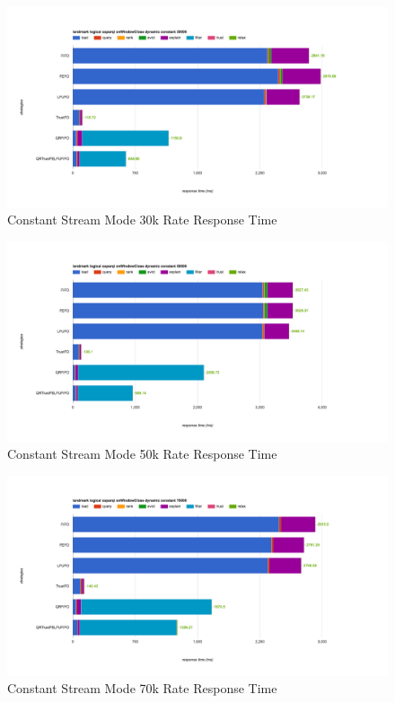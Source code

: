 \begin{figure}[!htbp]
	\centering
    \includegraphics[width=6.5in]{img/6-3wt.png}
    \caption{Constant Stream Mode 30k Rate Response Time}
    \label{fig:6-csmrrt3}
\end{figure}

\begin{figure}[!htbp]
	\centering
    \includegraphics[width=6.5in]{img/6-5wt.png}
    \caption{Constant Stream Mode 50k Rate Response Time}
    \label{fig:6-csmrrt5}
\end{figure}

\begin{figure}[!htbp]
	\centering
    \includegraphics[width=6.5in]{img/6-7wt.png}
    \caption{Constant Stream Mode 70k Rate Response Time}
    \label{fig:6-csmrrt7}
\end{figure}


